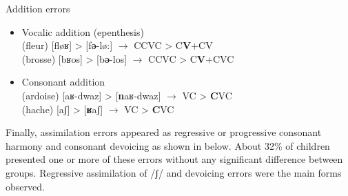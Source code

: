 \documentclass[output=paper,newtxmath,modfonts,nonflat,draftmode]{langsci/langscibook}
\begin{document}
\begin{exe}
\ex Addition errors \label{ex:takam:addition_errors}
\begin{itemize}
    \item Vocalic addition (epenthesis)\\
    (fleur) [fløʁ] > [f\textbf{ə}-lø:] $\rightarrow$ CCVC > C\textbf{V}+CV\\
    (brosse) [bʁos] > [b\textbf{ə}-los] $\rightarrow$ CCVC > C\textbf{V}+CVC\\
    \item Consonant addition\\
    (ardoise) [aʁ-dwaz] > [\textbf{n}aʁ-dwaz] $\rightarrow$ VC > \textbf{C}VC\\
(hache) [aʃ] > [\textbf{ʁ}aʃ] $\rightarrow$ VC > \textbf{C}VC\\
\end{itemize}
\end{exe}

Finally, assimilation errors appeared as regressive or progressive consonant harmony and consonant devoicing as shown in  below. About 32\% of children presented one or more of these errors without any significant difference between groups. Regressive assimilation of /ʃ/ and devoicing errors were the main forms observed.
\end{document}
